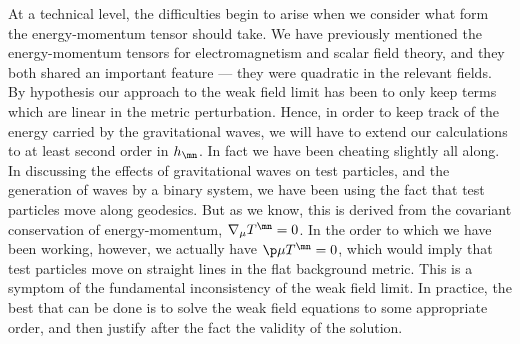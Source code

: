 \documentclass[12pt]{article}
\begin{document}
At a technical level, the difficulties begin to arise when we 
consider what form the energy-momentum tensor should take.
We have previously mentioned the energy-momentum tensors for
electromagnetism and scalar field theory, and they both
shared an important feature --- they were quadratic in the
relevant fields.  By hypothesis our approach to the weak field
limit has been to only keep terms which are linear in the 
metric perturbation.  Hence, in order to keep track of the
energy carried by the gravitational waves, we will have to
extend our calculations to at least second order in $h_\mn$.
In fact we have been cheating slightly all along.  In 
discussing the effects of gravitational waves on test particles,
and the generation of waves by a binary system, we have been
using the fact that test particles move along geodesics.  But
as we know, this is derived from the covariant conservation of
energy-momentum, $\nabla_\mu T^\mn=0$.  In the order to which
we have been working, however, we actually have $\p\mu T^\mn=0$,
which would imply that test particles move on straight lines
in the flat background metric.  This is a symptom of the
fundamental inconsistency of the weak field limit.  In practice,
the best that can be done is to solve the weak field equations
to some appropriate order, and then justify after the fact the
validity of the solution.
\end{document}
